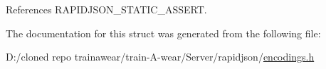 References R\+A\+P\+I\+D\+J\+S\+O\+N\+\_\+\+S\+T\+A\+T\+I\+C\+\_\+\+A\+S\+S\+E\+RT.



The documentation for this struct was generated from the following file\+:\begin{DoxyCompactItemize}
\item 
D\+:/cloned repo trainawear/train-\/\+A-\/wear/\+Server/rapidjson/\mbox{\hyperlink{encodings_8h}{encodings.\+h}}\end{DoxyCompactItemize}
